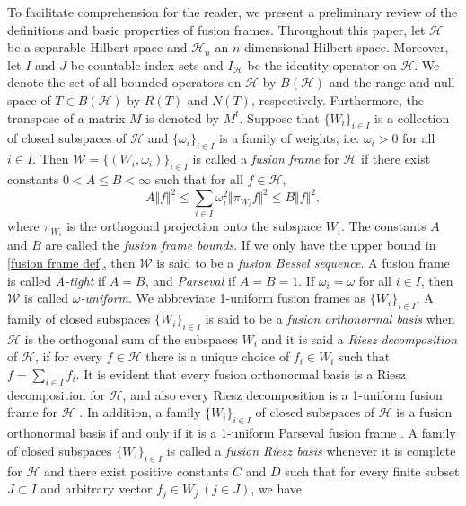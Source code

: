\documentclass[sn-mathphys-num]{sn-jnl}%
\theoremstyle{definition}
\theoremstyle{remark}
\numberwithin{equation}{section}
\begin{document}
To facilitate comprehension for the reader, we present a preliminary review of the definitions and basic properties of fusion frames.
Throughout this paper, let $\mathcal {H}$ be a separable Hilbert space and $\mathcal {H}_n$ an $n$-dimensional Hilbert space. Moreover, let $I$ and $J$ be countable index sets and $I_{\mathcal {H}}$ be the identity operator on $\mathcal {H}$. We denote the set of all bounded operators on $\mathcal {H}$ by $B(\mathcal {H})$ and the range and null space of $T \in B(\mathcal {H})$ by $R(T)$ and $N(T)$, respectively. Furthermore, the transpose of a matrix $M$ is denoted by $M^t$. Suppose that $\{W_{i}\}_{i \in I}$ is a collection of closed subspaces of $\mathcal {H}$ and $ \{\omega_{i}\}_{i \in I} $ is a family of weights, i.e. $\omega_{i}>0 $ for all $i \in I$. Then $ \mathcal{W}=\{(W_{i},\omega_{i})\}_{i \in I} $ is called a \textit{fusion frame} \cite{frame of subspace} for $\mathcal {H}$ if there exist constants $0<A\leq B<\infty$ such that for all $f \in \mathcal{H},$
\begin{equation}\label{fusion frame def}
A \Vert f\Vert^{2}\leq \sum _{i \in I} \omega_{i}^2\Vert \pi_{W_{i}}f \Vert ^{2} \leq B\Vert f \Vert ^{2},
\end{equation} 
where $\pi_{W_{i}}$ is the orthogonal projection onto the subspace $W_{i}.$ The constants $A$ and $B$ are called the \textit{fusion frame bounds}. If we only have the upper bound in \eqref{fusion frame def}, then $ \mathcal{W} $ is said to be a \textit{fusion Bessel sequence}. A fusion frame is called \textit{A-tight} if $ A=B $, and \textit{Parseval} if $ A=B=1 $. If $ \omega_{i}=\omega $ for all $ i\in I $, then $ \mathcal{W}$ is called \textit{$ \omega $-uniform}. We abbreviate 1-uniform fusion frames as $\{W_{i}\}_{i \in I}$. A family of closed subspaces $\{W_{i}\}_{i \in I} $ is said to be a \textit{fusion orthonormal basis} when $\mathcal {H}$ is the orthogonal sum of the subspaces $ W_{i}$ and it is said a \textit{Riesz decomposition} of $\mathcal {H}$, if for every $ f \in \mathcal{H} $ there is a unique choice of $ f_{i}\in W_{i} $ such that $ f=\sum _{i \in I} f_{i} $. It is evident that every fusion orthonormal basis is a Riesz decomposition for $\mathcal {H}$, and also every Riesz decomposition is a 1-uniform fusion frame for $\mathcal {H}$ \cite{frame of subspace}. In addition, a family $\{W_{i}\}_{i \in I} $ of closed subspaces of $\mathcal {H}$ is a fusion orthonormal basis if and only if it is a 1-uniform Parseval fusion frame \cite{frame of subspace}. A family of closed subspaces $\{W_{i}\}_{i \in I} $ is called a \textit{fusion Riesz basis} whenever it is complete for $\mathcal {H}$ and there exist positive constants $C$ and $D$ such that for every finite subset $ J\subset I $ and arbitrary vector $ f_{j}\in W_{j}~ (j \in J)$, we have
\end{document}
